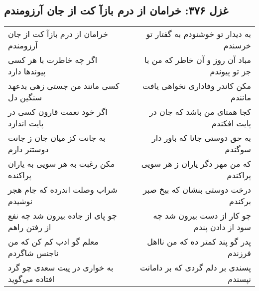 \begin{center}
\section*{غزل ۳۷۶: خرامان از درم بازآ کت از جان آرزومندم}
\label{sec:376}
\begin{longtable}{l p{0.5cm} r}
خرامان از درم بازآ کت از جان آرزومندم
&&
به دیدار تو خوشنودم به گفتار تو خرسندم
\\
اگر چه خاطرت با هر کسی پیوندها دارد
&&
مباد آن روز و آن خاطر که من با جز تو پیوندم
\\
کسی مانند من جستی زهی بدعهد سنگین دل
&&
مکن کاندر وفاداری نخواهی یافت مانندم
\\
اگر خود نعمت قارون کسی در پایت اندازد
&&
کجا همتای من باشد که جان در پایت افکندم
\\
به جانت کز میان جان ز جانت دوستتر دارم
&&
به حق دوستی جانا که باور دار سوگندم
\\
مکن رغبت به هر سویی به یاران پراکنده
&&
که من مهر دگر یاران ز هر سویی پراکندم
\\
شراب وصلت اندرده که جام هجر نوشیدم
&&
درخت دوستی بنشان که بیخ صبر برکندم
\\
چو پای از جاده بیرون شد چه نفع از رفتن راهم
&&
چو کار از دست بیرون شد چه سود از دادن پندم
\\
معلم گو ادب کم کن که من ناجنس شاگردم
&&
پدر گو پند کمتر ده که من نااهل فرزندم
\\
به خواری در پیت سعدی چو گرد افتاده می‌گوید
&&
پسندی بر دلم گردی که بر دامانت نپسندم
\\
\end{longtable}
\end{center}
